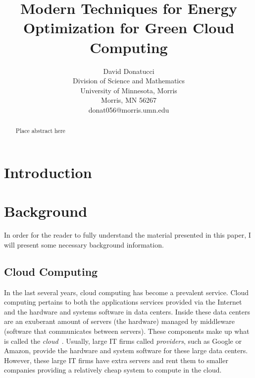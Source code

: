 \documentclass{sig-alternate}
\title{Modern Techniques for Energy Optimization for Green Cloud Computing}
\author{
\alignauthor
 		David Donatucci\\
        Division of Science and Mathematics\\
        University of Minnesota, Morris\\
        Morris, MN 56267\\
        donat056@morris.umn.edu\\
}
\date{}
\begin{document}
\pagestyle{plain}

\maketitle

\begin{abstract}

Place abstract here

\end{abstract}


\section{Introduction} \label{sec:intro}


\section{Background} \label{Background}

In order for the reader to fully understand the material presented in this paper, I will present some necessary background information.

\subsection{Cloud Computing}
\label{sec:Cloud Computing}

In the last several years, cloud computing has become a prevalent service. Cloud computing pertains to both the applications services provided via the Internet and the hardware and systems software in data centers. Inside these data centers are an exuberant amount of servers (the hardware) managed by middleware (software that communicates between servers). These components make up what is called the \emph{cloud}~\cite{Armbrust}. Usually, large IT firms called \emph{providers}, such as Google or Amazon, provide the hardware and system software for these large data centers. However, these large IT firms have extra servers and rent them to smaller companies providing a relatively cheap system to compute in the cloud. 
\end{document}
